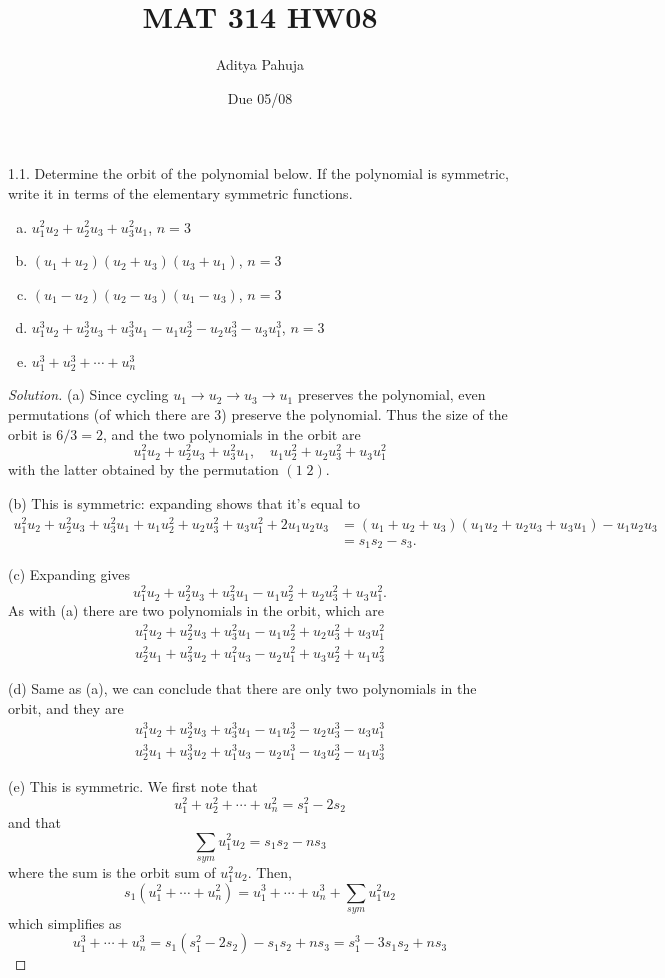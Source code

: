 \documentclass[10pt]{scrartcl}
\title{\vspace{-2em}MAT 314 HW08}
\author{\large Aditya Pahuja}
\date{\large Due 05/08}
\providecommand{\ii}{\item}
\newenvironment{soln}{\begin{proof}[Solution]}{\end{proof}}
\begin{document}
\maketitle

\begin{problem*}1.1.
	Determine the orbit of the polynomial below.
	If the polynomial is symmetric, write it in terms of
	the elementary symmetric functions.
	\begin{enumerate}[(a)]
		\ii $u_1^2u_2 + u_2^2u_3 + u_3^2u_1$, $n=3$
		\ii $(u_1+u_2)(u_2+u_3)(u_3+u_1)$, $n=3$
		\ii $(u_1-u_2)(u_2-u_3)(u_1-u_3)$, $n=3$
		\ii $u_1^3u_2 + u_2^3u_3 + u_3^3u_1 -
		u_1u_2^3 - u_2u_3^3 - u_3u_1^3$, $n=3$
		\ii $u_1^3 + u_2^3 + \cdots + u_n^3$
	\end{enumerate}
\end{problem*}

\begin{soln}
	(a) Since cycling $u_1\to u_2\to u_3\to u_1$
	preserves the polynomial, even permutations (of which there are $3$)
	preserve the polynomial. Thus the size of the orbit is $6/3=2$,
	and the two polynomials in the orbit are
	\[u_1^2u_2 + u_2^2u_3 + u_3^2u_1,\quad u_1u_2^2 + u_2u_3^2 + u_3u_1^2\]
	with the latter obtained by the permutation $(1\;2)$.
	
	(b) This is symmetric: expanding shows that it's equal to
	\begin{align*}
		u_1^2u_2 + u_2^2u_3 + u_3^2u_1 + u_1u_2^2 + u_2u_3^2 + u_3u_1^2
		+ 2u_1u_2u_3 &= (u_1+u_2+u_3)(u_1u_2+u_2u_3+u_3u_1) - u_1u_2u_3\\
		&= \boxed{s_1s_2 - s_3}.
	\end{align*}
	
	(c) Expanding gives
	\[u_1^2u_2 + u_2^2u_3 + u_3^2u_1
	- u_1u_2^2 + u_2u_3^2 + u_3u_1^2.\]
	As with (a) there are two polynomials in the orbit, which are
	\begin{align*}
		u_1^2u_2 + u_2^2u_3 + u_3^2u_1
		- u_1u_2^2 + u_2u_3^2 + u_3u_1^2\\
		u_2^2u_1 + u_3^2u_2 + u_1^2u_3
		- u_2u_1^2 + u_3u_2^2 + u_1u_3^2
	\end{align*}
	
	(d) Same as (a), we can conclude that
	there are only two polynomials in the orbit, and they are
	\begin{align*}
		u_1^3u_2 + u_2^3u_3 + u_3^3u_1 -
		u_1u_2^3 - u_2u_3^3 - u_3u_1^3\\
		u_2^3u_1 + u_3^3u_2 + u_1^3u_3 -
		u_2u_1^3 - u_3u_2^3 - u_1u_3^3
	\end{align*}

	(e) This is symmetric. We first note that
	\[u_1^2 + u_2^2 + \cdots + u_n^2 = s_1^2 - 2s_2\]
	and that
	\[\sum_{sym}u_1^2u_2 = s_1s_2 - ns_3\]
	where the sum is the orbit sum of $u_1^2u_2$. Then,
	\[s_1(u_1^2 +\cdots+ u_n^2) = u_1^3 + \cdots + u_n^3 + \sum_{sym}u_1^2u_2\]
	which simplifies as
	\[u_1^3 + \cdots + u_n^3 = s_1(s_1^2-2s_2) - s_1s_2 + ns_3
	= \boxed{s_1^3 - 3s_1s_2 + ns_3}\]
\end{soln}
\end{document}
